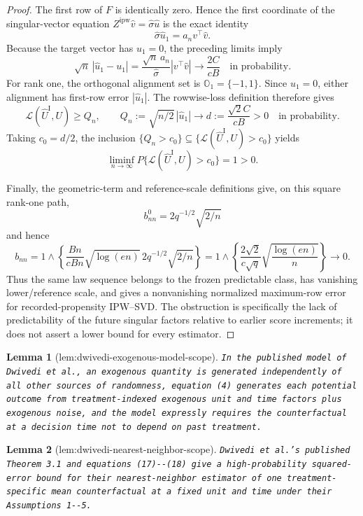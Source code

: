 \documentclass{article}
\newtheorem{lemma}{Lemma}
\begin{document}
\begin{proof}
The first row of \(F\) is identically zero.  Hence the first coordinate of the singular-vector equation \(Z^{\mathrm{ipw}}\widehat v=\widehat\sigma\widehat u\) is the exact identity
\[
\widehat\sigma\widehat u_1=a_n v^\top\widehat v.
\]
Because the target vector has \(u_1=0\), the preceding limits imply
\[
\sqrt n\,|\widehat u_1-u_1|
=\frac{\sqrt n\,a_n}{\widehat\sigma}|v^\top\widehat v|
\longrightarrow\frac{2C}{cB}
\quad\text{in probability}.
\]
For rank one, the orthogonal alignment set is \(\mathbb O_1=\{-1,1\}\).  Since \(u_1=0\), either alignment has first-row error \(|\widehat u_1|\).  The rowwise-loss definition therefore gives
\[
\mathcal L(\widehat U^{\mathrm I},U)
\ge Q_n,
\qquad
Q_n:=\sqrt{n/2}\,|\widehat u_1|
\longrightarrow d:=\frac{\sqrt2 C}{cB}>0
\quad\text{in probability}.
\]
Taking \(c_0=d/2\), the inclusion \(\{Q_n>c_0\}\subseteq\{\mathcal L(\widehat U^{\mathrm I},U)>c_0\}\) yields
\[
\liminf_{n\to\infty}P\{\mathcal L(\widehat U^{\mathrm I},U)>c_0\}=1>0.
\]

Finally, the geometric-term and reference-scale definitions give, on this square rank-one path,
\[
b^0_{nn}=2q^{-1/2}\sqrt{2/n}
\]
and hence
\[
b_{nn}
=1\wedge\left\{
\frac{Bn}{cBn}\sqrt{\log(en)}\,
2q^{-1/2}\sqrt{2/n}
\right\}
=1\wedge\left\{\frac{2\sqrt2}{c\sqrt q}
\sqrt{\frac{\log(en)}n}\right\}
\longrightarrow0.
\]
Thus the same law sequence belongs to the frozen predictable class, has vanishing lower/reference scale, and gives a nonvanishing normalized maximum-row error for recorded-propensity IPW--SVD.  The obstruction is specifically the lack of predictability of the future singular factors relative to earlier score increments; it does not assert a lower bound for every estimator.
\end{proof}

\begin{lemma}[lem:dwivedi-exogenous-model-scope]\label{lem:dwivedi-exogenous-model-scope}
\texttt{In the published model of Dwivedi et al.,\allowbreak{} an exogenous quantity is generated independently of all other sources of randomness,\allowbreak{} equation (4) generates each potential outcome from treatment-\allowbreak{}indexed exogenous unit and time factors plus exogenous noise,\allowbreak{} and the model expressly requires the counterfactual at a decision time not to depend on past treatment.}
\end{lemma}

\begin{lemma}[lem:dwivedi-nearest-neighbor-scope]\label{lem:dwivedi-nearest-neighbor-scope}
\texttt{Dwivedi et al.'s published Theorem 3.1 and equations (17)-\allowbreak{}-\allowbreak{}(18) give a high-\allowbreak{}probability squared-\allowbreak{}error bound for their nearest-\allowbreak{}neighbor estimator of one treatment-\allowbreak{}specific mean counterfactual at a fixed unit and time under their Assumptions 1-\allowbreak{}-\allowbreak{}5.}
\end{lemma}
\end{document}
